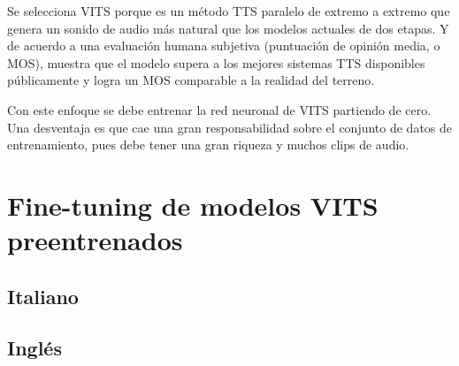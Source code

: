 Se selecciona VITS porque es un método TTS paralelo de extremo a extremo que genera un sonido de audio más natural que los modelos actuales de dos etapas. Y de acuerdo a una evaluación humana subjetiva (puntuación de opinión media, o MOS), muestra que el modelo supera a los mejores sistemas TTS disponibles públicamente y logra un MOS comparable a la realidad del terreno.

Con este enfoque se debe entrenar la red neuronal de VITS partiendo de cero. Una desventaja es que cae una gran responsabilidad sobre el conjunto de datos de entrenamiento, pues debe tener una gran riqueza y muchos clips de audio.
	
	
\section{Fine-tuning de modelos VITS preentrenados}



\subsection{Italiano}

\subsection{Inglés}
	








